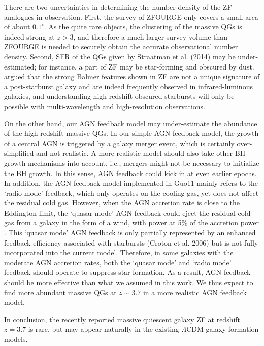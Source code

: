 \documentclass[useAMS,usenatbib]{mn2e}
\begin{document}
There are two uncertainties in determining the number density of the ZF analogues in observation. First, the survey of ZFOURGE \citep{Straatman14} only covers a small area of about $0.1^{\circ}$. As the quite rare objects, the clustering of the massive QGs is indeed strong at $z>3$, and therefore a much larger survey volume than ZFOURGE is needed to securely obtain the accurate observational number density. Second, SFR of the QGs given by Straatman et al. (2014) may be under-estimated; for instance, a part of ZF may be star-forming and obscured by dust. \cite{Simpson17} argued that the strong Balmer features shown in ZF are not a unique signature of a post-starburst galaxy and are indeed frequently observed in infrared-luminous galaxies, and understanding high-redshift obscured starbursts will only be possible with multi-wavelength and high-resolution observations.

On the other hand, our AGN feedback model may under-estimate the abundance of the high-redshift massive QGs. In our simple AGN feedback model, the growth of a central AGN is triggered by a galaxy merger event, which is certainly over-simplified and not realistic. A more realistic model should also take other BH growth mechanisms into account, i.e., mergers might not be necessary to initialize the BH growth. In this sense, AGN feedback could kick in at even earlier epochs. In addition, the AGN feedback model implemented in Guo11 mainly refers to the `radio mode' feedback, which only operates on the cooling gas, yet does not affect the residual cold gas. However, when the AGN accretion rate is close to the Eddington limit, the `quasar mode' AGN feedback \citep{Croton06} could eject the residual cold gas from a galaxy in the form of a wind, with power at 5\% of the accretion power \citep{Saez09,Dunn10}. This `quasar mode' AGN feedback is only partially represented by an enhanced feedback efficiency associated with starbursts (Croton et al. 2006) but is not fully incorporated into the current model. Therefore, in some galaxies with the moderate AGN accretion rates, both the `quasar mode' and `radio mode' feedback should operate to suppress star formation. As a result, AGN feedback should be more effective than what we assumed in this work. We thus expect to find more abundant massive QGs at $z\sim 3.7$ in a more realistic AGN feedback model.

In conclusion, the recently reported massive quiescent galaxy ZF at redshift $z=3.7$ is rare, but may appear naturally in the existing $\Lambda$CDM galaxy formation models.
\end{document}

